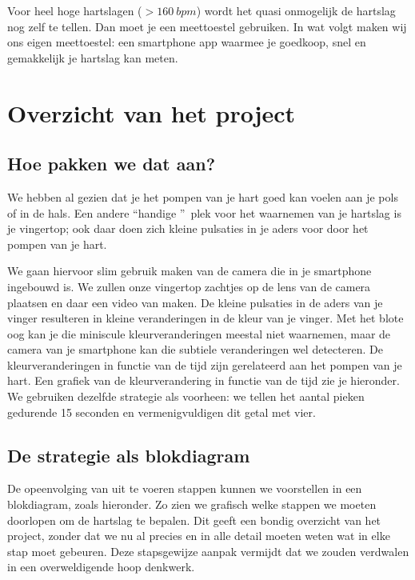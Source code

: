 Voor heel hoge hartslagen ($>160~bpm$) wordt het quasi onmogelijk de hartslag nog zelf te tellen. Dan moet je een meettoestel gebruiken. In wat volgt maken wij ons eigen meettoestel: een smartphone app waarmee je goedkoop, snel en gemakkelijk je hartslag kan meten.

\section{Overzicht van het project}
\label{sec:Mod1_Sec3}

\subsection{Hoe pakken we dat aan?}
We hebben al gezien dat je het pompen van je hart goed kan voelen aan je pols of in de hals. Een andere \textquotedblleft handige \textquotedblright \ plek voor het waarnemen van je hartslag is je vingertop; ook daar doen zich kleine pulsaties in je aders voor door het pompen van je hart. 


We gaan hiervoor slim gebruik maken van de camera die in je smartphone ingebouwd is. 
We zullen onze vingertop zachtjes op de lens van de camera plaatsen en daar een video van maken. 
De kleine pulsaties in de aders van je vinger resulteren in kleine veranderingen in de kleur van je vinger. 
Met het blote oog kan je die miniscule kleurveranderingen meestal niet waarnemen, maar de camera van je smartphone kan die subtiele veranderingen wel detecteren. 
De kleurveranderingen in functie van de tijd zijn gerelateerd aan het pompen van je hart. Een grafiek van de kleurverandering in functie van de tijd zie je hieronder. We gebruiken dezelfde strategie als voorheen: we tellen het aantal pieken gedurende 15 seconden en vermenigvuldigen dit getal met vier.


\subsection{De strategie als blokdiagram}

De opeenvolging van uit te voeren stappen kunnen we voorstellen in een blokdiagram, zoals hieronder. Zo zien we grafisch welke stappen we moeten doorlopen om de hartslag te bepalen. Dit geeft een bondig overzicht van het project, zonder dat we nu al precies en in alle detail moeten weten wat in elke stap moet gebeuren. Deze stapsgewijze aanpak vermijdt dat we zouden verdwalen in een overweldigende hoop denkwerk.

